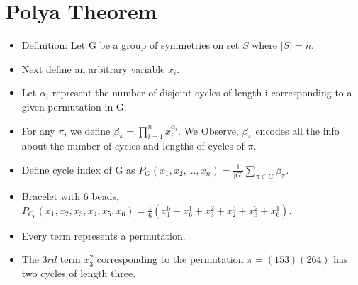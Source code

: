 \documentclass{beamer}
\begin{document}
\section{Polya Theorem}

\begin{frame}
\begin{itemize}

\pause
\item Definition: Let G be a group of symmetries on set $S$ where ${|S|} = n$.

\pause
\item Next define an arbitrary variable $x_{i}$.

\pause
\item Let $\alpha_{i}$ represent the number of disjoint cycles of length i corresponding to a given permutation in G.

\pause
\item For any ${\pi}$, we define $\beta_{\pi}=\displaystyle\prod_{i=1}^{n} x_{i}^{\alpha_{i}}$. We Observe, $\beta_{\pi}$ encodes all the info about the number of cycles and lengths of cycles of ${\pi}$.

\end{itemize}
\end{frame}


\begin{frame}
\begin{itemize}

\item Define cycle index of G as $P_{G}(x_{1},x_{2},...,x_{n})=\frac{1}{\vert{G}\vert}\displaystyle\sum_{{\pi} \in G}{\beta_{\pi}}$.

\end{itemize}
\end{frame}


\begin{frame}
\begin{itemize}

\pause
\item Bracelet with 6 beads, $P_{C_{6}}(x_{1},x_{2},x_{3},x_{4},x_{5},x_{6})=\frac{1}{6}(x_{1}^{6} + x_{6}^{1} + x_{3}^{2} + x_{2}^{3} + x_{3}^{2} + x_{6}^{1})$.

\pause
\item Every term represents a permutation.

\pause
\item The $3rd$ term $x_{3}^{2}$ corresponding to the permutation ${\pi} = (153)(264)$ has two cycles of length three.


\end{itemize}
\end{frame}
\end{document}
